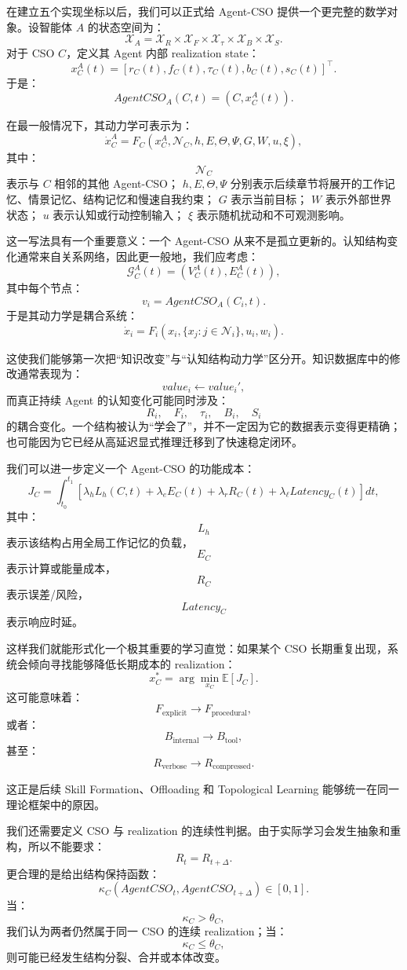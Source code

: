 在建立五个实现坐标以后，我们可以正式给 Agent-CSO 提供一个更完整的数学对象。设智能体 $A$ 的状态空间为：
\[
\mathcal X_A
=
\mathcal X_R
\times
\mathcal X_F
\times
\mathcal X_\tau
\times
\mathcal X_B
\times
\mathcal X_S.
\]
对于 CSO $C$，定义其 Agent 内部 realization state：
\[
x_C^A(t)
=
\left[
r_C(t),
f_C(t),
\tau_C(t),
b_C(t),
s_C(t)
\right]^\top.
\]
于是：
\[
AgentCSO_A(C,t)
=
(C,x_C^A(t)).
\]

在最一般情况下，其动力学可表示为：
\[
\dot x_C^A
=
F_C
\left(
x_C^A,
\mathcal N_C,
h,
E,
\Theta,
\Psi,
G,
W,
u,
\xi
\right),
\]
其中：
\[
\mathcal N_C
\]
表示与 $C$ 相邻的其他 Agent-CSO；
$h,E,\Theta,\Psi$ 分别表示后续章节将展开的工作记忆、情景记忆、结构记忆和慢速自我约束；
$G$ 表示当前目标；
$W$ 表示外部世界状态；
$u$ 表示认知或行动控制输入；
$\xi$ 表示随机扰动和不可观测影响。

这一写法具有一个重要意义：一个 Agent-CSO 从来不是孤立更新的。认知结构变化通常来自关系网络，因此更一般地，我们应考虑：
\[
\mathcal G_C^A(t)
=
\left(
V_C^A(t),
E_C^A(t)
\right),
\]
其中每个节点：
\[
v_i
=
AgentCSO_A(C_i,t).
\]
于是其动力学是耦合系统：
\[
\dot x_i
=
F_i
\left(
x_i,
\{x_j:j\in\mathcal N_i\},
u_i,
w_i
\right).
\]

这使我们能够第一次把“知识改变”与“认知结构动力学”区分开。知识数据库中的修改通常表现为：
\[
value_i
\leftarrow
value_i',
\]
而真正持续 Agent 的认知变化可能同时涉及：
\[
R_i,\quad
F_i,\quad
\tau_i,\quad
B_i,\quad
S_i
\]
的耦合变化。一个结构被认为“学会了”，并不一定因为它的数据表示变得更精确；也可能因为它已经从高延迟显式推理迁移到了快速稳定闭环。

我们可以进一步定义一个 Agent-CSO 的功能成本：
\[
J_C
=
\int_{t_0}^{t_1}
\left[
\lambda_h L_h(C,t)
+
\lambda_e E_C(t)
+
\lambda_r R_C(t)
+
\lambda_\ell Latency_C(t)
\right]dt,
\]
其中：
\[
L_h
\]
表示该结构占用全局工作记忆的负载，
\[
E_C
\]
表示计算或能量成本，
\[
R_C
\]
表示误差/风险，
\[
Latency_C
\]
表示响应时延。

这样我们就能形式化一个极其重要的学习直觉：如果某个 CSO 长期重复出现，系统会倾向寻找能够降低长期成本的 realization：
\[
x_C^\ast
=
\arg\min_{x_C}
\mathbb E[J_C].
\]
这可能意味着：
\[
F_{\text{explicit}}
\rightarrow
F_{\text{procedural}},
\]
或者：
\[
B_{\text{internal}}
\rightarrow
B_{\text{tool}},
\]
甚至：
\[
R_{\text{verbose}}
\rightarrow
R_{\text{compressed}}.
\]

这正是后续 Skill Formation、Offloading 和 Topological Learning 能够统一在同一理论框架中的原因。

我们还需要定义 CSO 与 realization 的连续性判据。由于实际学习会发生抽象和重构，所以不能要求：
\[
R_t=R_{t+\Delta}.
\]
更合理的是给出结构保持函数：
\[
\kappa_C
\left(
AgentCSO_t,
AgentCSO_{t+\Delta}
\right)
\in[0,1].
\]
当：
\[
\kappa_C>\theta_C,
\]
我们认为两者仍然属于同一 CSO 的连续 realization；当：
\[
\kappa_C\leq\theta_C,
\]
则可能已经发生结构分裂、合并或本体改变。

